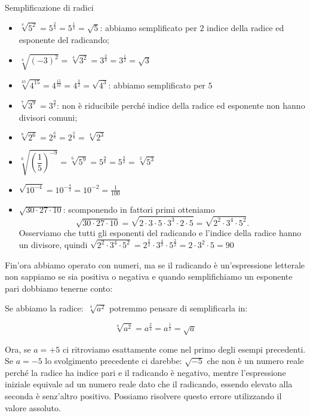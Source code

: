  \begin{esempio}
Semplificazione di radici
\begin{itemize}
 \item $\sqrt[4]{5^2}=5^{\frac{2}{4}}=5^{\frac{1}{2}}=\sqrt 5$: 
  abbiamo semplificato per $2$ indice della radice ed esponente del radicando;
 \item $\sqrt[4]{(-3)^2}=\sqrt[4]{3^2}=3^{\frac{2}{4}}=3^{\frac{1}{2}}=\sqrt 3$
 \item $\sqrt[10]{4^{15}}=4^{\frac{15}{10}}=4^{\frac{3}{2}}=\sqrt{4^3}$: 
  abbiamo semplificato per $5$
 \item $\sqrt[7]{3^9}=3^{\frac{9}{7}}$: 
  non è riducibile perché indice della radice ed esponente non hanno divisori 
  comuni;
 \item $\sqrt[8]{2^6}=2^{\frac{6}{8}}=2^{\frac{3}{4}}=\sqrt[4]{2^3}$
 \item $\sqrt[6]{\left(\dfrac{1}{5}\right)^{-9}}=\sqrt[6]{5^9}=
        5^{\frac{9}{6}}=5^{\frac{3}{2}}=\sqrt[2]{5^3}$
 \item $\sqrt{10^{-4}}=10^{-\frac{4}{2}}=10^{-2}=\frac 1{100}$
 \item $\sqrt{30\cdot 27\cdot 10}$: scomponendo in fattori primi otteniamo 
  \[\sqrt{30\cdot 27\cdot 10}=
    \sqrt{2\cdot 3\cdot 5\cdot 3^3\cdot 2\cdot 5}=
    \sqrt{2^2\cdot 3^4\cdot 5^2}.\] 
    Osserviamo che tutti gli esponenti del radicando e l'indice della radice 
    hanno un divisore, quindi 
    $\sqrt{2^2\cdot 3^4\cdot 5^2}=
     2^{\frac{2}{2}} \cdot 3^{\frac{4}{2}} \cdot 5^{\frac{2}{2}}=
     2\cdot 3^2\cdot 5=90$
\end{itemize}
\end{esempio}

Fin'ora abbiamo operato con numeri, ma se il radicando è un'espressione 
letterale non sappiamo se sia positiva o negativa e quando semplifichiamo un 
esponente pari dobbiamo tenerne conto:

\begin{esempio}
 Se abbiamo la radice:~$\sqrt[4]{a^2}$ potremmo pensare di semplificarla in:
 
 \[\sqrt[4]{a^2}=a^{\frac{2}{4}}=a^{\frac{1}{2}}=\sqrt a\]
 
 Ora, se $a=+5$ ci ritroviamo esattamente come nel primo degli esempi 
 precedenti. Se $a=-5$ lo svolgimento precedente ci darebbe: $\sqrt {-5}$ 
 che non è un numero reale perché la radice ha indice pari e il radicando 
 è negativo, mentre l'espressione iniziale equivale ad un numero reale dato 
 che il radicando, essendo elevato alla seconda è senz'altro positivo.
 Possiamo risolvere questo errore utilizzando il valore assoluto.
\end{esempio}

